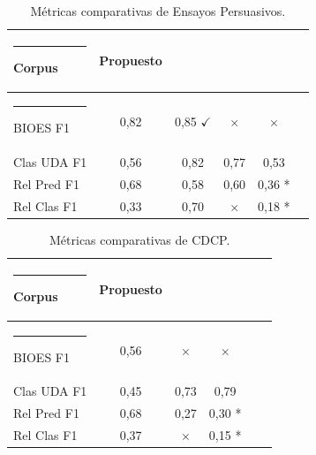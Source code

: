 \documentclass[a4paper,11pt,twocolumn,twoside]{article}
\begin{document}
\begin{table}[h]
	\begin{center}
		\begin{tabular}{|l|c|c|c|c|c|} 
			\hline\rule{-2pt}{15pt}
			{\bf Corpus}      & {\bf Propuesto} & {\bf \cite{stab2017parsing}} & {\bf \cite{niculae2017argument}} & {\bf \cite{galassi2021deep}} \\ 
			\hline\rule{-4pt}{10pt}
			BIOES F1    & 0,82      & 0,85 $\checkmark$      & $\times$                   & $\times$               \\
			Clas UDA F1 & 0,56      & 0,82                   & 0,77                       & 0,53                   \\
			Rel Pred F1 & 0,68      & 0,58                   & 0,60                       & 0,36 *                 \\
			Rel Clas F1 & 0,33      & 0,70                   & $\times$                   & 0,18 *                 \\ 
			\hline
		\end{tabular}
		\caption{\label{table:comparative_test_essays_f1_metrics_segmenter}Métricas comparativas de Ensayos Persuasivos.}
	\end{center}
\end{table}
\begin{table}[h]
	\begin{center}
		\begin{tabular}{|l|c|c|c|c|c|} 
			\hline\rule{-2pt}{15pt}
			{\bf Corpus}      & {\bf Propuesto} & {\bf \cite{niculae2017argument}} & {\bf \cite{galassi2021deep}} \\ 
			\hline\rule{-4pt}{10pt}
			BIOES F1    & 0,56      & $\times$                   & $\times$               \\
			Clas UDA F1 & 0,45      & 0,73                       & 0,79                   \\
			Rel Pred F1 & 0,68      & 0,27                       & 0,30	*                  \\
			Rel Clas F1 & 0,37      & $\times$                   & 0,15	*                  \\ 
			\hline
		\end{tabular}
		\caption{\label{table:comparative_test_cdcp_f1_metrics_segmenter}Métricas comparativas de CDCP.}
	\end{center}
\end{table}
\end{document}
